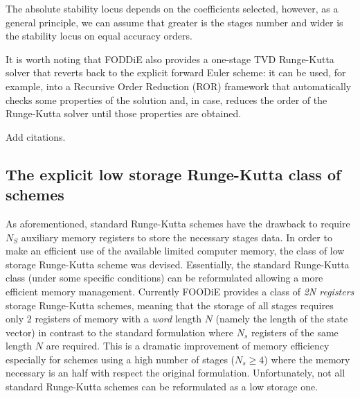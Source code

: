 \documentclass[pdftex,preprint,3p,times,numbers]{elsarticle}
\begin{document}
\begin{table}[!ht]
  \centering
  \caption{Butcher's table of 5 stages, $4^{th}$ order accurate, Runge-Kutta SSP scheme\label{tab:RK-SSP-butcher-5}}
\end{table}
The absolute stability locus depends on the coefficients selected, however, as a general principle, we can assume that greater is the stages number and wider is the stability locus on equal accuracy orders.

It is worth noting that FODDiE also provides a one-stage TVD Runge-Kutta solver that reverts back to the explicit forward Euler scheme: it can be used, for example, into a Recursive Order Reduction (ROR) framework that automatically checks some properties of the solution and, in case, reduces the order of the Runge-Kutta solver until those properties are obtained.

{\color{red} Add citations.}

\subsection{The explicit low storage Runge-Kutta class of schemes}

As aforementioned, standard Runge-Kutta schemes have the drawback to require $N_S$ auxiliary memory registers to store the necessary stages data. In order to make an efficient use of the available limited computer memory, the class of low storage Runge-Kutta scheme was devised. Essentially, the standard Runge-Kutta class (under some specific conditions) can be reformulated allowing a more efficient memory management. Currently FOODiE provides a class of \emph{2N registers} storage Runge-Kutta schemes, meaning that the storage of all stages requires only 2 registers of memory with a \emph{word} length $N$ (namely the length of the state vector) in contrast to the standard formulation where $N_s$ registers of the same length $N$ are required. This is a dramatic improvement of memory efficiency especially for schemes using a high number of stages ($N_s \ge 4$) where the memory necessary is an half with respect the original formulation. Unfortunately, not all standard Runge-Kutta schemes can be reformulated as a low storage one.
\end{document}
